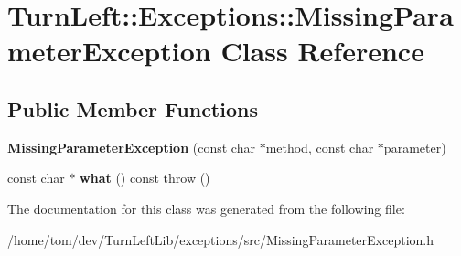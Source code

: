 \hypertarget{classTurnLeft_1_1Exceptions_1_1MissingParameterException}{
\section{TurnLeft::Exceptions::MissingParameterException Class Reference}
\label{classTurnLeft_1_1Exceptions_1_1MissingParameterException}
}
\subsection*{Public Member Functions}
\begin{DoxyCompactItemize}
\item 
\hypertarget{classTurnLeft_1_1Exceptions_1_1MissingParameterException_a5db66bc95c60f9eb83e71197efdf10a7}{
{\bfseries MissingParameterException} (const char $\ast$method, const char $\ast$parameter)}
\label{classTurnLeft_1_1Exceptions_1_1MissingParameterException_a5db66bc95c60f9eb83e71197efdf10a7}

\item 
\hypertarget{classTurnLeft_1_1Exceptions_1_1MissingParameterException_a475acbb9e8b2365546c3d93468327c51}{
const char $\ast$ {\bfseries what} () const   throw ()}
\label{classTurnLeft_1_1Exceptions_1_1MissingParameterException_a475acbb9e8b2365546c3d93468327c51}

\end{DoxyCompactItemize}


The documentation for this class was generated from the following file:\begin{DoxyCompactItemize}
\item 
/home/tom/dev/TurnLeftLib/exceptions/src/MissingParameterException.h\end{DoxyCompactItemize}
